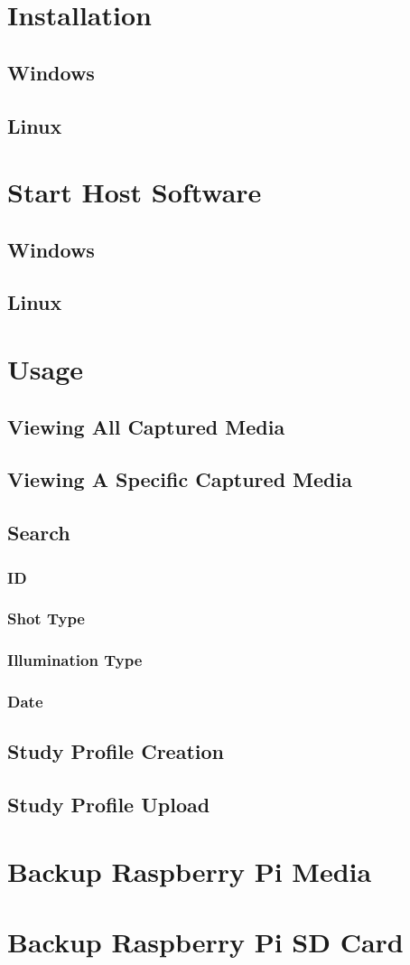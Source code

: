 \documentclass[12pt]{article}
\begin{document}
  
  \tableofcontents
  \newpage
  \section{Installation}
  \subsection{Windows}
  \subsection{Linux}
  \section{Start Host Software}
  \subsection{Windows}
  \subsection{Linux}
  \section{Usage}
  \subsection{Viewing All Captured Media}
  \subsection{Viewing A Specific Captured Media}
  \subsection{Search}
  \subsubsection{ID}
  \subsubsection{Shot Type}
  \subsubsection{Illumination Type}
  \subsubsection{Date}
  \subsection{Study Profile Creation}
  \subsection{Study Profile Upload}
  \section{Backup Raspberry Pi Media}
  \section{Backup Raspberry Pi SD Card}
\end{document}
